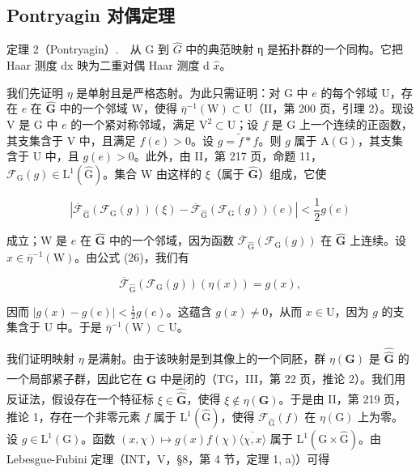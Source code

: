 \subsection{Pontryagin 对偶定理}

定理 2（Pontryagin）.　从 G 到 \(\widehat{G}\) 中的典范映射 η 是拓扑群的一个同构。它把 Haar 测度 dx 映为二重对偶 Haar 测度 d \(\widehat{x}\)。

我们先证明 \(\eta\) 是单射且是严格态射。为此只需证明：对 G 中 \(e\) 的每个邻域 U，存在 \(e\) 在 \(\widehat{\mathbf{G}}\) 中的一个邻域 W，使得 \(\overline{\eta}^{-1}(\mathrm{W})\subset \mathrm{U}\)（II，第 200 页，引理 2）。现设 V 是 G 中 \(e\) 的一个紧对称邻域，满足 \(\mathrm{V}^2\subset \mathrm{U}\)；设 \(f\) 是 G 上一个连续的正函数，其支集含于 V 中，且满足 \(f(e) > 0\)。设 \(g = \widetilde{f}*f\)。则 \(g\) 属于 \(\mathrm{A}(\mathrm{G})\)，其支集含于 U 中，且 \(g(e) > 0\)。此外，由 II，第 217 页，命题 11，\(\mathcal{F}_{\mathrm{G}}(g)\in \mathrm{L}^{1}(\widehat{\mathrm{G}})\)。集合 W 由这样的 \(\xi\)（属于 \(\widehat{\mathbf{G}}\)）组成，它使

\[
\left| \overline {{\mathcal {F}}} _ {\widehat {\mathrm{G}}} (\mathcal {F} _ {\mathrm{G}} (g)) (\xi) - \overline {{\mathcal {F}}} _ {\widehat {\mathrm{G}}} (\mathcal {F} _ {\mathrm{G}} (g)) (e) \right| <   \frac {1}{2} g (e)
\]

成立；W 是 \(e\) 在 \(\widehat{\mathbf{G}}\) 中的一个邻域，因为函数 \(\overline{\mathcal{F}}_{\widehat{\mathrm{G}}}(\mathcal{F}_{\mathrm{G}}(g))\) 在 \(\widehat{\mathbf{G}}\) 上连续。设 \(x \in \overline{\eta}^{-1}(\mathrm{W})\)。由公式 (26)，我们有

\[
\overline {{\mathcal {F}}} _ {\widehat {\mathrm{G}}} (\mathcal {F} _ {\mathrm{G}} (g)) (\eta (x)) = g (x),
\]

因而 \(|g(x) - g(e)| < \frac{1}{2} g(e)\)。这蕴含 \(g(x) \neq 0\)，从而 \(x \in \mathrm{U}\)，因为 \(g\) 的支集含于 U 中。于是 \(\overline{\eta}^{-1}(\mathrm{W}) \subset \mathrm{U}\)。

我们证明映射 \(\eta\) 是满射。由于该映射是到其像上的一个同胚，群 \(\eta(\mathbf{G})\) 是 \(\widehat{\widehat{\mathbf{G}}}\) 的一个局部紧子群，因此它在 \(\widehat{\widehat{\mathbf{G}}}\) 中是闭的（TG，III，第 22 页，推论 2）。我们用反证法，假设存在一个特征标 \(\xi \in \widehat{\widehat{\mathbf{G}}}\)，使得 \(\xi \notin \eta(\mathbf{G})\)。于是由 II，第 219 页，推论 1，存在一个非零元素 \(f\) 属于 \(\mathrm{L}^1(\widehat{\mathrm{G}})\)，使得 \(\mathcal{F}_{\widehat{\mathrm{G}}} (f)\) 在 \(\eta(\mathrm{G})\) 上为零。设 \(g \in \mathrm{L}^1(\mathrm{G})\)。函数 \((x, \chi) \mapsto g(x)f(\chi)\overline{\langle\chi,x\rangle}\) 属于 \(\mathrm{L}^1(\mathrm{G} \times \widehat{\mathrm{G}})\)。由 Lebesgue-Fubini 定理（INT，V，§8，第 4 节，定理 1, a)）可得

